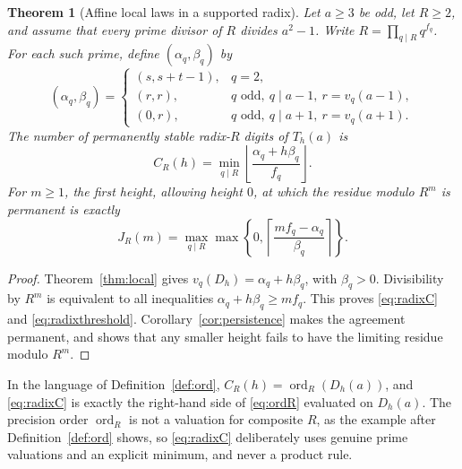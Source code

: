\documentclass[11pt,letterpaper]{article}
\numberwithin{equation}{section}
\newtheorem{theorem}{Theorem}[section]
\theoremstyle{definition}
\theoremstyle{remark}
\newcommand{\ceil}[1]{\left\lceil #1\right\rceil}
\newcommand{\floor}[1]{\left\lfloor #1\right\rfloor}
\DeclareMathOperator{\ordop}{ord}
\begin{document}
\begin{theorem}[Affine local laws in a supported radix]\label{thm:general-radix}
Let $a\ge3$ be odd, let $R\ge2$, and assume that every prime divisor of $R$ divides $a^2-1$. Write $R=\prod_{q\mid R}q^{f_q}$. For each such prime, define $(\alpha_q,\beta_q)$ by
\[
 (\alpha_q,\beta_q)=
 \begin{cases}
 (s,s+t-1),&q=2,\\
 (r,r),&q\text{ odd},\ q\mid a-1,\ r=v_q(a-1),\\
 (0,r),&q\text{ odd},\ q\mid a+1,\ r=v_q(a+1).
 \end{cases}
\]
The number of permanently stable radix-$R$ digits of $T_h(a)$ is
\begin{equation}\label{eq:radixC}
 C_R(h)=\min_{q\mid R}\floor{\frac{\alpha_q+h\beta_q}{f_q}}.
\end{equation}
For $m\ge1$, the first height, allowing height $0$, at which the residue modulo $R^m$ is permanent is exactly
\begin{equation}\label{eq:radixthreshold}
 J_R(m)=\max_{q\mid R}\max\left\{0,
       \ceil{\frac{mf_q-\alpha_q}{\beta_q}}\right\}.
\end{equation}
\end{theorem}
\begin{proof}
Theorem~\ref{thm:local} gives $v_q(D_h)=\alpha_q+h\beta_q$, with $\beta_q>0$. Divisibility by $R^m$ is equivalent to all inequalities $\alpha_q+h\beta_q\ge mf_q$. This proves \eqref{eq:radixC} and \eqref{eq:radixthreshold}. Corollary~\ref{cor:persistence} makes the agreement permanent, and shows that any smaller height fails to have the limiting residue modulo $R^m$.
\end{proof}

In the language of Definition~\ref{def:ord}, $C_R(h)=\ordop_R(D_h(a))$, and \eqref{eq:radixC} is exactly the right-hand side of \eqref{eq:ordR} evaluated on $D_h(a)$. The precision order $\ordop_R$ is not a valuation for composite $R$, as the example after Definition~\ref{def:ord} shows, so \eqref{eq:radixC} deliberately uses genuine prime valuations and an explicit minimum, and never a product rule.
\end{document}
